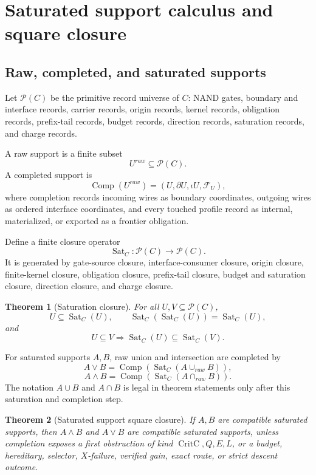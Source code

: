 \documentclass[10.5pt,a4paper]{article}
\newtheorem{theorem}{Theorem}[section]
\newcommand{\Front}{\mathcal F}
\newcommand{\Sat}{\operatorname{Sat}}
\newcommand{\Comp}{\operatorname{Comp}}
\newcommand{\CritC}{\operatorname{CritC}}
\begin{document}
\section{Saturated support calculus and square closure}

\subsection{Raw, completed, and saturated supports}
Let \(\mathcal P(C)\) be the primitive record universe of \(C\): NAND gates, boundary and interface records, carrier records, origin records, kernel records, obligation records, prefix-tail records, budget records, direction records, saturation records, and charge records.

A raw support is a finite subset
\[
U^{raw}\subseteq\mathcal P(C).
\]
A completed support is
\[
\Comp(U^{raw})=(U,\partial U,\iota U,\Front_U),
\]
where completion records incoming wires as boundary coordinates, outgoing wires as ordered interface coordinates, and every touched profile record as internal, materialized, or exported as a frontier obligation.

Define a finite closure operator
\[
\Sat_C:\mathcal P(C)\to\mathcal P(C).
\]
It is generated by gate-source closure, interface-consumer closure, origin closure, finite-kernel closure, obligation closure, prefix-tail closure, budget and saturation closure, direction closure, and charge closure.

\begin{theorem}[Saturation closure]
For all \(U,V\subseteq\mathcal P(C)\),
\[
U\subseteq\Sat_C(U),\qquad \Sat_C(\Sat_C(U))=\Sat_C(U),
\]
and
\[
U\subseteq V\Longrightarrow \Sat_C(U)\subseteq\Sat_C(V).
\]
\end{theorem}

For saturated supports \(A,B\), raw union and intersection are completed by
\[
A\vee B=\Comp(\Sat_C(A\cup_{raw}B)),
\]
\[
A\wedge B=\Comp(\Sat_C(A\cap_{raw}B)).
\]
The notation \(A\cup B\) and \(A\cap B\) is legal in theorem statements only after this saturation and completion step.

\begin{theorem}[Saturated support square closure]
If \(A,B\) are compatible saturated supports, then \(A\wedge B\) and \(A\vee B\) are compatible saturated supports, unless completion exposes a first obstruction of kind \(\CritC,Q,E,L\), or a budget, hereditary, selector, \(X\)-failure, verified gain, exact route, or strict descent outcome.
\end{theorem}
\end{document}

